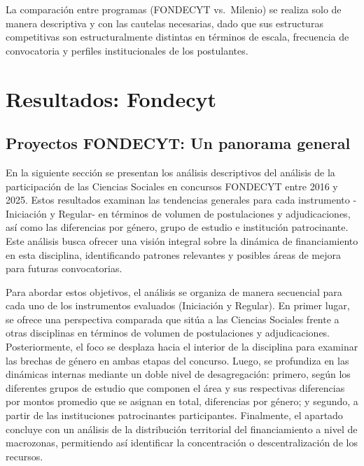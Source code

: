 \documentclass[
  spanish,
  a4paper,
  oneside]{scrbook}
\begin{document}
La comparación entre programas (FONDECYT vs.~Milenio) se realiza solo de
manera descriptiva y con las cautelas necesarias, dado que sus
estructuras competitivas son estructuralmente distintas en términos de
escala, frecuencia de convocatoria y perfiles institucionales de los
postulantes.


\chapter{Resultados: Fondecyt}\label{resultados-fondecyt}

\section{Proyectos FONDECYT: Un panorama
general}\label{proyectos-fondecyt-un-panorama-general}

En la siguiente sección se presentan los análisis descriptivos del
análisis de la participación de las Ciencias Sociales en concursos
FONDECYT entre 2016 y 2025. Estos resultados examinan las tendencias
generales para cada instrumento -Iniciación y Regular- en términos de
volumen de postulaciones y adjudicaciones, así como las diferencias por
género, grupo de estudio e institución patrocinante. Este análisis busca
ofrecer una visión integral sobre la dinámica de financiamiento en esta
disciplina, identificando patrones relevantes y posibles áreas de mejora
para futuras convocatorias.

Para abordar estos objetivos, el análisis se organiza de manera
secuencial para cada uno de los instrumentos evaluados (Iniciación y
Regular). En primer lugar, se ofrece una perspectiva comparada que sitúa
a las Ciencias Sociales frente a otras disciplinas en términos de
volumen de postulaciones y adjudicaciones. Posteriormente, el foco se
desplaza hacia el interior de la disciplina para examinar las brechas de
género en ambas etapas del concurso. Luego, se profundiza en las
dinámicas internas mediante un doble nivel de desagregación: primero,
según los diferentes grupos de estudio que componen el área y sus
respectivas diferencias por montos promedio que se asignan en total,
diferencias por género; y segundo, a partir de las instituciones
patrocinantes participantes. Finalmente, el apartado concluye con un
análisis de la distribución territorial del financiamiento a nivel de
macrozonas, permitiendo así identificar la concentración o
descentralización de los recursos.
\end{document}
